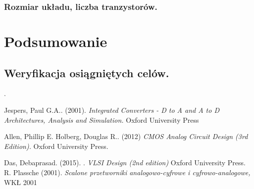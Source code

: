 \documentclass[10pt,a4paper]{report}
\begin{document}
	\subsection{Rozmiar układu, liczba tranzystorów.}

	\chapter{Podsumowanie}
	\section{Weryfikacja osiągniętych celów.}
	
	
	\appendix
.
	\begin{thebibliography}{9}
		Jespers, Paul G.A.. (2001). 
		\textit{Integrated Converters - D to A and A to D Architectures, Analysis and Simulation.}
		Oxford University Press
		
		Allen, Phillip E. Holberg, Douglas R.. (2012)  
		\textit{CMOS Analog Circuit Design (3rd Edition). }
		Oxford University Press.
		
		Das, Debaprasad. (2015). .
		\textit{VLSI Design (2nd edition)}
		Oxford University Press.
		R. Plassche (2001). 
		\textit{Scalone przetworniki analogowo-cyfrowe i cyfrowo-analogowe,}
		WKŁ 2001
	\end{thebibliography}
\end{document}

